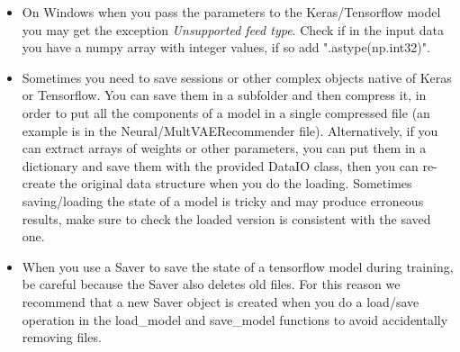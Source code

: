 \documentclass[a4paper]{article}
\begin{document}
\begin{itemize}
    \item On Windows when you pass the parameters to the Keras/Tensorflow model you may get the exception \emph{Unsupported feed type}. Check if in the input data you have a numpy array with integer values, if so add ".astype(np.int32)".
    \item Sometimes you need to save sessions or other complex objects native of Keras or Tensorflow. You can save them in a subfolder and then compress it, in order to put all the components of a model in a single compressed file (an example is in the Neural/MultVAERecommender file). Alternatively, if you can extract arrays of weights or other parameters, you can put them in a dictionary and save them with the provided DataIO class, then you can re-create the original data structure when you do the loading. Sometimes saving/loading the state of a model is tricky and may produce erroneous results, make sure to check the loaded version is consistent with the saved one.
    \item When you use a Saver to save the state of a tensorflow model during training, be careful because the Saver also deletes old files. For this reason we recommend that a new Saver object is created when you do a load/save operation in the load\_model and save\_model functions to avoid accidentally removing files.
\end{itemize}






\clearpage

\clearpage
\appendix




\end{document}
